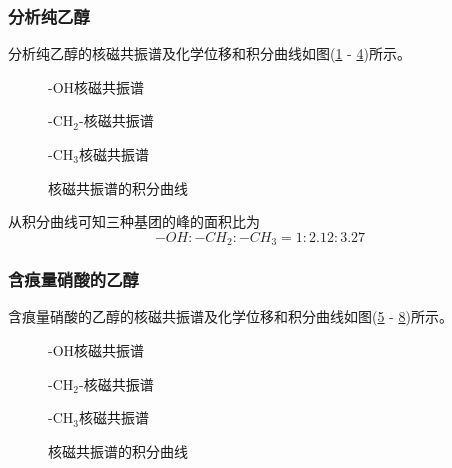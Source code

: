 \documentclass[a4paper]{article}
\begin{document}
\subsubsection{分析纯乙醇}
分析纯乙醇的核磁共振谱及化学位移和积分曲线如图(\ref{1OH} - \ref{1Integral})所示。
\begin{figure}[!h]
\centering
\caption{-OH核磁共振谱}\label{1OH}
\end{figure}
\begin{figure}[!h]
\centering
\caption{-CH$_2$-核磁共振谱}\label{1CH2}
\end{figure}
\begin{figure}[!h]
\centering
\caption{-CH$_3$核磁共振谱}\label{1CH3}
\end{figure}
\begin{figure}[!h]
\centering
\caption{核磁共振谱的积分曲线}\label{1Integral}
\end{figure}

从积分曲线可知三种基团的峰的面积比为
\begin{equation*}
-OH : -CH_2 : -CH_3 = 1 : 2.12 : 3.27
\end{equation*}

\newpage
\subsubsection{含痕量硝酸的乙醇}
含痕量硝酸的乙醇的核磁共振谱及化学位移和积分曲线如图(\ref{2OH} - \ref{2Integral})所示。
\begin{figure}[!h]
\centering
\caption{-OH核磁共振谱}\label{2OH}
\end{figure}
\begin{figure}[!h]
\centering
\caption{-CH$_2$-核磁共振谱}\label{2CH2}
\end{figure}
\begin{figure}[!h]
\centering
\caption{-CH$_3$核磁共振谱}\label{2CH3}
\end{figure}
\begin{figure}[!h]
\centering
\caption{核磁共振谱的积分曲线}\label{2Integral}
\end{figure}
\end{document}
